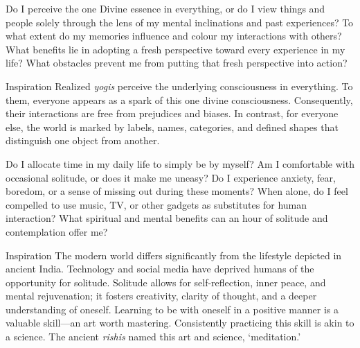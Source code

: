 


\newpage
\begin{mananam}{}
\mananamtext Do I perceive the one Divine essence in everything, or do I view things and people solely through the lens of my mental inclinations and past experiences? To what extent do my memories influence and colour my interactions with others? What benefits lie in adopting a fresh perspective toward every experience in my life? What obstacles prevent me from putting that fresh perspective into action?
\end{mananam}
\WritingHand{}
\begin{inspiration}{\mananamfont Inspiration}
\mananamtext Realized \emph{yogis} perceive the underlying consciousness in everything. To them, everyone appears as a spark of this one divine consciousness. Consequently, their interactions are free from prejudices and biases. In contrast, for everyone else, the world is marked by labels, names, categories, and defined shapes that distinguish one object from another.
\end{inspiration}
\newpage


\newpage
\begin{mananam}{}
\mananamtext Do I allocate time in my daily life to simply be by myself? Am I comfortable with occasional solitude, or does it make me uneasy? Do I experience anxiety, fear, boredom, or a sense of missing out during these moments?
When alone, do I feel compelled to use music, TV, or other gadgets as substitutes for human interaction? What spiritual and mental benefits can an hour of solitude and contemplation offer me?
\end{mananam}
\WritingHand{}
\begin{inspiration}{\mananamfont Inspiration}
\mananamtext The modern world differs significantly from the lifestyle depicted in ancient India. Technology and social media have deprived humans of the opportunity for solitude. Solitude allows for self-reflection, inner peace, and mental rejuvenation; it fosters creativity, clarity of thought, and a deeper understanding of oneself.
Learning to be with oneself in a positive manner is a valuable skill—an art worth mastering. Consistently practicing this skill is akin to a science. The ancient \emph{rishis} named this art and science, ‘meditation.’
\end{inspiration}
\newpage

